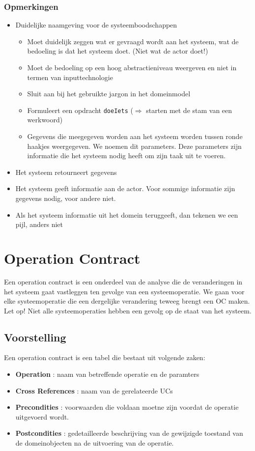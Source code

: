 \subsubsection{Opmerkingen}
\begin{itemize}
	\item Duidelijke naamgeving voor de systeemboodschappen 
\begin{itemize}
	\item Moet duidelijk zeggen wat er gevraagd wordt aan het systeem, wat de bedoeling is dat het systeem doet. (Niet wat de actor doet!)
	\item Moet de bedoeling op een hoog abstractieniveau weergeven en niet in termen van inputtechnologie
	\item Sluit aan bij het gebruikte jargon in het domeinmodel
	\item Formuleert een opdracht \texttt{doeIets} ($\Rightarrow$ starten met de stam van een werkwoord)
	\item Gegevens die meegegeven worden aan het systeem worden tussen ronde haakjes weergegeven. We noemen dit parameters. Deze parameters zijn informatie die het systeem nodig heeft om zijn taak uit te voeren.
\end{itemize}
	\item Het systeem retourneert gegevens
	\item Het systeem geeft informatie aan de actor. Voor sommige informatie zijn gegevens nodig, voor andere niet.
	\item Als het systeem informatie uit het domein teruggeeft, dan tekenen we een pijl, anders niet

\end{itemize}

\section{Operation Contract}

Een operation contract is een onderdeel van de analyse die de veranderingen in het systeem gaat vastleggen ten gevolge van een systeemoperatie. We gaan voor elke systeemoperatie die een dergelijke verandering teweeg brengt een OC maken. Let op! Niet alle systeemoperaties hebben een gevolg op de staat van het systeem.

\subsection{Voorstelling}
Een operation  contract is een tabel die bestaat uit volgende zaken:
\begin{itemize}
	\item \textbf{Operation} : naam van betreffende operatie en de paramters
	\item \textbf{Cross References }: naam van de gerelateerde UCs
	\item \textbf{Precondities} : voorwaarden die voldaan moetne zijn voordat de operatie uitgevoerd wordt.
	\item \textbf{Postcondities} : gedetailleerde beschrijving van de gewijzigde toestand van de domeinobjecten na de uitvoering van de operatie. 
\end{itemize}


